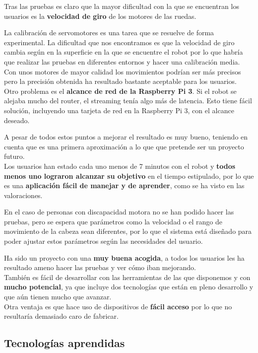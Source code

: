 \documentclass[twoside, 11pt]{epstfg}
\begin{document}
Tras las pruebas es claro que la mayor dificultad con la que se encuentran los usuarios es la \textbf{velocidad de giro} de los motores de las ruedas.

La calibración de servomotores es una tarea que se resuelve de forma experimental. La dificultad que nos encontramos es que la velocidad de giro cambia según en la superficie en la que se encuentre el robot por lo que habría que realizar las pruebas en diferentes entornos y hacer una calibración media.\\Con unos motores de mayor calidad los movimientos podrían ser más precisos pero la precisión obtenida ha resultado bastante aceptable para los usuarios.\\
Otro problema es el \textbf{alcance de red de la Raspberry Pi 3}. Si el robot se alejaba mucho del router, el streaming tenía algo más de latencia. Esto tiene fácil solución, incluyendo una tarjeta de red en la Raspberry Pi 3, con el alcance deseado.

A pesar de todos estos puntos a mejorar el resultado es muy bueno, teniendo en cuenta que es una primera aproximación a lo que que pretende ser un proyecto futuro.\\Los usuarios han estado cada uno menos de 7 minutos con el robot y \textbf{todos menos uno lograron alcanzar su objetivo} en el tiempo estipulado, por lo que es una \textbf{aplicación fácil de manejar y de aprender}, como se ha visto en las valoraciones.

En el caso de personas con discapacidad motora no se han podido hacer las pruebas, pero se espera que parámetros como la velocidad o el rango de movimiento de la cabeza sean diferentes, por lo que el sistema está diseñado para poder ajustar estos parámetros según las necesidades del usuario.

Ha sido un proyecto con una \textbf{muy buena acogida}, a todos los usuarios les ha resultado ameno hacer las pruebas y ver cómo iban mejorando.\\
También es fácil de desarrollar con las herramientas de las que disponemos y con \textbf{mucho potencial}, ya que incluye dos tecnologías que están en pleno desarrollo y que aún tienen mucho que avanzar.\\
Otra ventaja es que hace uso de dispositivos de \textbf{fácil acceso} por lo que no resultaría demasiado caro de fabricar.

\subsection{Tecnologías aprendidas}
\end{document}
